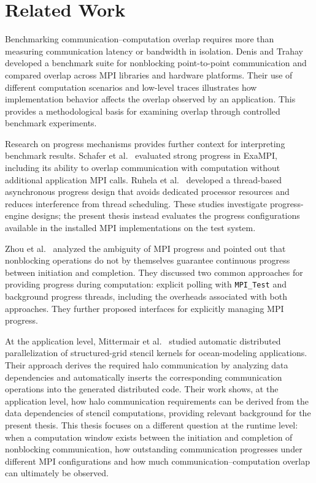 \section{Related Work}
\label{sec:related-work}

Benchmarking communication--computation overlap requires more than measuring
communication latency or bandwidth in isolation. Denis and
Trahay~\cite{denis2016mpi} developed a benchmark suite for nonblocking
point-to-point communication and compared overlap across MPI libraries and
hardware platforms. Their use of different computation scenarios and
low-level traces illustrates how implementation behavior affects the overlap
observed by an application. This provides a methodological basis for
examining overlap through controlled benchmark experiments.


Research on progress mechanisms provides further context for interpreting
benchmark results. Schafer et al.~\cite{schafer2021exampiProgress} evaluated
strong progress in ExaMPI, including its ability to overlap communication
with computation without additional application MPI calls. Ruhela et
al.~\cite{ruhela2019async} developed a thread-based asynchronous progress
design that avoids dedicated processor resources and reduces interference
from thread scheduling. These studies investigate progress-engine designs;
the present thesis instead evaluates the progress configurations available
in the installed MPI implementations on the test system.

Zhou et al.~\cite{zhou2024mpiProgressForAll} analyzed the ambiguity of MPI progress and pointed out that nonblocking operations do not by themselves guarantee continuous progress between initiation and completion. They discussed two common approaches for providing progress during computation: explicit polling with \texttt{MPI\_Test} and background progress threads, including the overheads associated with both approaches. They further proposed interfaces for explicitly managing MPI progress.



At the application level, Mittermair et al.~\cite{mittermair2025automatic} studied automatic distributed parallelization of structured-grid stencil kernels for ocean-modeling applications. Their approach derives the required halo communication by analyzing data dependencies and automatically inserts the corresponding communication operations into the generated distributed code. Their work shows, at the application level, how halo communication requirements can be derived from the data dependencies of stencil computations, providing relevant background for the present thesis. This thesis focuses on a different question at the runtime level: when a computation window exists between the initiation and completion of nonblocking communication, how outstanding communication progresses under different MPI configurations and how much communication--computation overlap can ultimately be observed.

